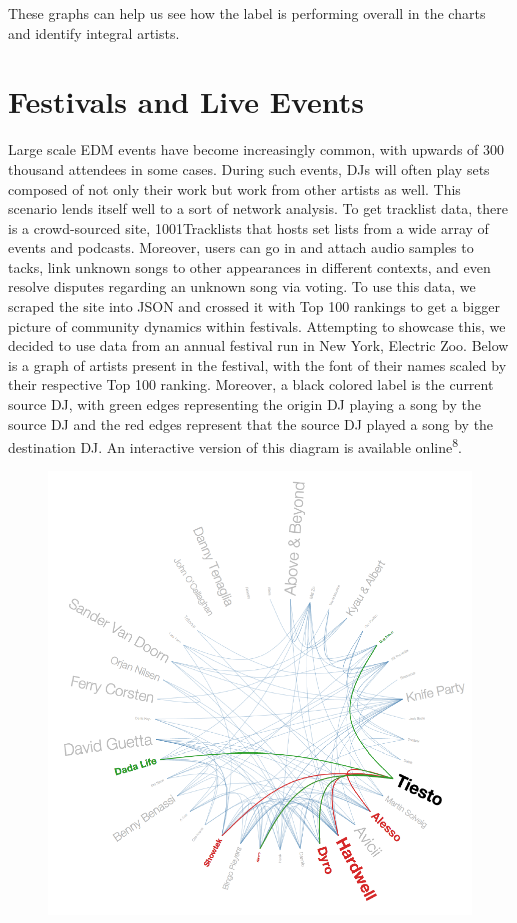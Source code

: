 \documentclass[12pt]{dalcsthesis}
\begin{document}
These graphs can help us see how the label is performing overall in the charts and identify integral artists. 

\chapter{Festivals and Live Events}

Large scale EDM events have become increasingly common, with upwards of 300 thousand attendees in some cases. During such events, DJs will often play sets composed of not only their work but work from other artists as well. This scenario lends itself well to a sort of network analysis. To get tracklist data, there is a crowd-sourced site, 1001Tracklists that hosts set lists from a wide array of events and podcasts. Moreover, users can go in and attach audio samples to tacks, link unknown songs to other appearances in different contexts, and even resolve disputes regarding an unknown song via voting. To use this data, we scraped the site into JSON and crossed it with Top 100 rankings to get a bigger picture of community dynamics within festivals. Attempting to showcase this, we decided to use data from an annual festival run in New York, Electric Zoo. Below is a graph of artists present in the festival, with the font of their names scaled by their respective Top 100 ranking. Moreover, a black colored label is the current source DJ, with green edges representing the origin DJ playing a song by the source DJ and the red edges represent that the source DJ played a song by the destination DJ. An interactive version of this diagram is available online\textsuperscript{8}. 

\begin{figure}[h]
\includegraphics[scale=.7]{network_diagram}
\centering
\end{figure} \newpage
\end{document}
